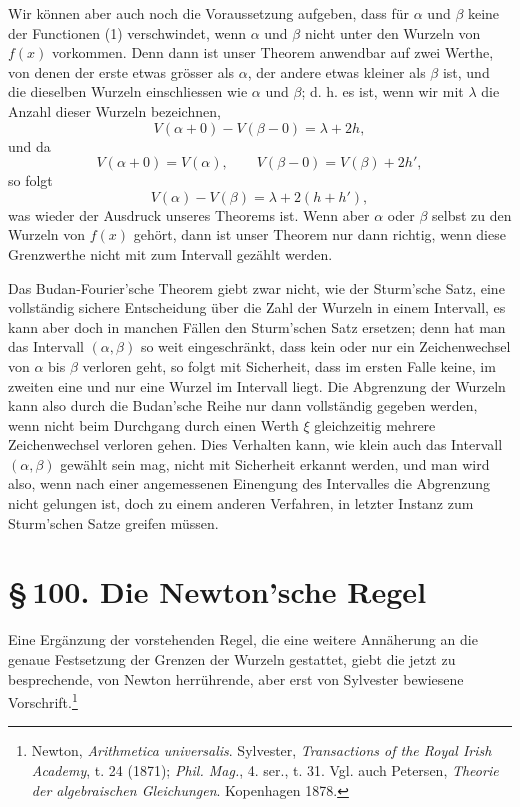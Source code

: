 \documentclass[11pt]{article}
\providecommand{\sect}[2]{\section*{\S\,#1. #2}}
\begin{document}
Wir können aber auch noch die Voraussetzung aufgeben, dass für $\alpha$ und $\beta$ keine der Functionen (1) verschwindet, wenn $\alpha$ und $\beta$ nicht unter den Wurzeln von $f(x)$ vorkommen. Denn dann ist unser Theorem anwendbar auf zwei Werthe, von denen der erste etwas grösser als $\alpha$, der andere etwas kleiner als $\beta$ ist, und die dieselben Wurzeln einschliessen wie $\alpha$ und $\beta$; d. h. es ist, wenn wir mit $\lambda$ die Anzahl dieser Wurzeln bezeichnen,
\[
        V(\alpha+0)-V(\beta-0)=\lambda+2h,
\]
und da
\[
        V(\alpha+0)=V(\alpha),\qquad
        V(\beta-0)=V(\beta)+2h',
\]
so folgt
\[
        V(\alpha)-V(\beta)=\lambda+2(h+h'),
\]
was wieder der Ausdruck unseres Theorems ist. Wenn aber $\alpha$ oder $\beta$ selbst zu den Wurzeln von $f(x)$ gehört, dann ist unser Theorem nur dann richtig, wenn diese Grenzwerthe nicht mit zum Intervall gezählt werden.

Das Budan-Fourier'sche Theorem giebt zwar nicht, wie der Sturm'sche Satz, eine vollständig sichere Entscheidung über die Zahl der Wurzeln in einem Intervall, es kann aber doch in manchen Fällen den Sturm'schen Satz ersetzen; denn hat man das Intervall $(\alpha,\beta)$ so weit eingeschränkt, dass kein oder nur ein Zeichenwechsel von $\alpha$ bis $\beta$ verloren geht, so folgt mit Sicherheit, dass im ersten Falle keine, im zweiten eine und nur eine Wurzel im Intervall liegt. Die Abgrenzung der Wurzeln kann also durch die Budan'sche Reihe nur dann vollständig gegeben werden, wenn nicht beim Durchgang durch einen Werth $\xi$ gleichzeitig mehrere Zeichenwechsel verloren gehen. Dies Verhalten kann, wie klein auch das Intervall $(\alpha,\beta)$ gewählt sein mag, nicht mit Sicherheit erkannt werden, und man wird also, wenn nach einer angemessenen Einengung des Intervalles die Abgrenzung nicht gelungen ist, doch zu einem anderen Verfahren, in letzter Instanz zum Sturm'schen Satze greifen müssen.

\sect{100}{Die Newton'sche Regel}

Eine Ergänzung der vorstehenden Regel, die eine weitere Annäherung an die genaue Festsetzung der Grenzen der Wurzeln gestattet, giebt die jetzt zu besprechende, von Newton herrührende, aber erst von Sylvester bewiesene Vorschrift.\footnote{Newton, \emph{Arithmetica universalis}. Sylvester, \emph{Transactions of the Royal Irish Academy}, t. 24 (1871); \emph{Phil. Mag.}, 4. ser., t. 31. Vgl. auch Petersen, \emph{Theorie der algebraischen Gleichungen}. Kopenhagen 1878.}
\end{document}
